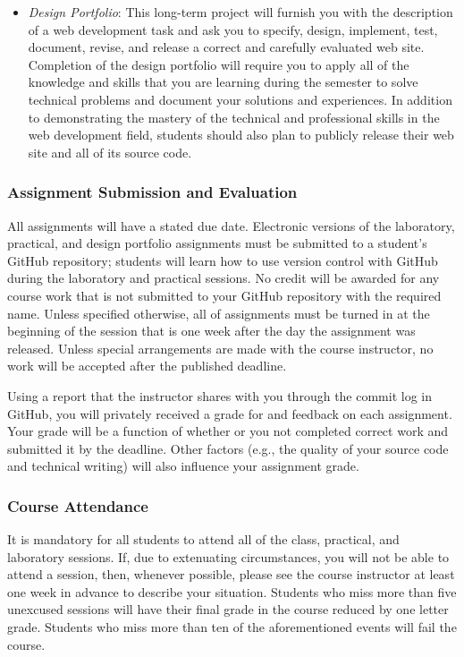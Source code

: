 \documentclass[11pt]{article}
\begin{document}
\begin{itemize}
  \item {\em Design Portfolio\/}: This long-term project will furnish you with
    the description of a web development task and ask you to specify, design,
    implement, test, document, revise, and release a correct and carefully
    evaluated web site. Completion of the design portfolio will require you to
    apply all of the knowledge and skills that you are learning during the
    semester to solve technical problems and document your solutions and
    experiences. In addition to demonstrating the mastery of the technical and
    professional skills in the web development field, students should also plan
    to publicly release their web site and all of its source code.

\end{itemize}

\subsubsection*{Assignment Submission and Evaluation}

All assignments will have a stated due date. Electronic versions of the
laboratory, practical, and design portfolio assignments must be submitted to a
student's GitHub repository; students will learn how to use version control with
GitHub during the laboratory and practical sessions. No credit will be awarded
for any course work that is not submitted to your GitHub repository with the
required name. Unless specified otherwise, all of assignments must be turned in
at the beginning of the session that is one week after the day the assignment
was released. Unless special arrangements are made with the course instructor,
no work will be accepted after the published deadline.

Using a report that the instructor shares with you through the commit log in
GitHub, you will privately received a grade for and feedback on each assignment.
Your grade will be a function of whether or you not completed correct work and
submitted it by the deadline. Other factors (e.g., the quality of your source
code and technical writing) will also influence your assignment grade.

\subsubsection*{Course Attendance}

It is mandatory for all students to attend all of the class, practical, and
laboratory sessions. If, due to extenuating circumstances, you will not be able
to attend a session, then, whenever possible, please see the course instructor
at least one week in advance to describe your situation. Students who miss more
than five unexcused sessions will have their final grade in the course reduced
by one letter grade. Students who miss more than ten of the aforementioned
events will fail the course.
\end{document}
